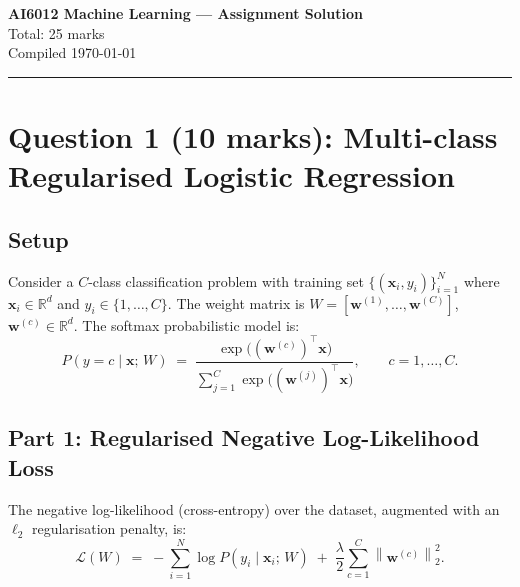\documentclass[12pt,a4paper]{article}
\newcommand{\R}{\mathbb{R}}
\newcommand{\bx}{\bm{x}}
\newcommand{\bw}{\bm{w}}
\newcommand{\norm}[1]{\left\lVert #1 \right\rVert}
\begin{document}
\begin{center}
  {\LARGE\bfseries AI6012 Machine Learning --- Assignment Solution}\\[0.4em]
  {\large Total: 25 marks}\\[0.2em]
  {\small\color{gray}Compiled \today}
\end{center}

\vspace{1em}
\hrule
\vspace{1em}

\section{Question 1 (10 marks): Multi-class Regularised Logistic Regression}

\subsection*{Setup}

Consider a $C$-class classification problem with training set $\{(\bx_i, y_i)\}_{i=1}^N$
where $\bx_i \in \R^d$ and $y_i \in \{1, \ldots, C\}$.
The weight matrix is $W = [\bw^{(1)}, \ldots, \bw^{(C)}]$,
$\bw^{(c)} \in \R^d$.
The softmax probabilistic model is:
\begin{equation}
  P(y = c \mid \bx;\, W)
  \;=\;
  \frac{\exp\!\bigl((\bw^{(c)})^\top \bx\bigr)}
       {\displaystyle\sum_{j=1}^{C} \exp\!\bigl((\bw^{(j)})^\top \bx\bigr)},
  \qquad c = 1, \ldots, C.
  \label{eq:softmax}
\end{equation}

\subsection{Part 1: Regularised Negative Log-Likelihood Loss}

The negative log-likelihood (cross-entropy) over the dataset, augmented with an
$\ell_2$ regularisation penalty, is:
\begin{equation}
  \mathcal{L}(W)
  \;=\;
  -\sum_{i=1}^{N} \log P(y_i \mid \bx_i;\, W)
  \;+\;
  \frac{\lambda}{2}\sum_{c=1}^{C}\norm{\bw^{(c)}}_{2}^{2}.
  \label{eq:loss_raw}
\end{equation}
\end{document}
